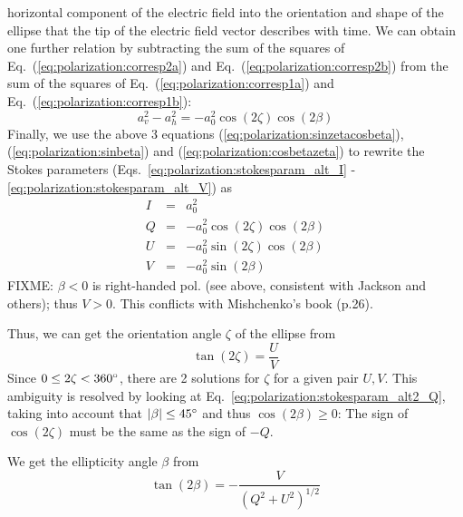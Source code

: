 horizontal component of the electric field into the orientation and
shape of the ellipse that the tip of the electric field vector describes with
time.  We can obtain one further relation by subtracting the sum of
the squares of Eq.~(\ref{eq:polarization:corresp2a}) and
Eq.~(\ref{eq:polarization:corresp2b}) from the sum of the squares of
Eq.~(\ref{eq:polarization:corresp1a}) and
Eq.~(\ref{eq:polarization:corresp1b}):
\begin{equation}
  \label{eq:polarization:cosbetazeta}
 a_v^2 - a_h^2 =  -a_0^2 \cos(2\zeta)\cos(2\beta)
\end{equation}
Finally, we use the above 3 equations
(\ref{eq:polarization:sinzetacosbeta}), 
(\ref{eq:polarization:sinbeta}) and 
(\ref{eq:polarization:cosbetazeta}) to rewrite the Stokes parameters
(Eqs.~\ref{eq:polarization:stokesparam_alt_I}%
-\ref{eq:polarization:stokesparam_alt_V}) 
as
\begin{eqnarray}
  \label{eq:polarization:stokesparam_alt2_I}
 I &=& a_0^2\\
  \label{eq:polarization:stokesparam_alt2_Q}
 Q &=&  -a_0^2 \cos(2\zeta)\cos(2\beta)\\ 
  \label{eq:polarization:stokesparam_alt2_U}
 U &=& -a_0^2 \sin(2\zeta)\cos(2\beta)\\
  \label{eq:polarization:stokesparam_alt2_V}
 V &=& -a_0^2 \sin(2\beta)
\end{eqnarray}
FIXME: $\beta<0$ is right-handed pol. (see above, consistent with
Jackson and others); thus $V>0$. This conflicts with Mishchenko's book
(p.26).
  

Thus, we can get the orientation angle $\zeta$ of the ellipse from
\begin{equation}
  \label{eq:polarization:tan2zeta}
 \tan(2\zeta) = \frac{U}{V}
\end{equation}
Since $0 \leq 2\zeta < 360^\circ$, there are 2 solutions for $\zeta$ for a
given pair $U,V$. This ambiguity is resolved by looking at
Eq.~\ref{eq:polarization:stokesparam_alt2_Q}, taking into account that
$|\beta| \leq 45^\circ$ and thus $\cos(2\beta) \geq 0$:
The sign of $\cos(2\zeta)$ must be the same as the sign of $-Q$.

We get the ellipticity angle $\beta$  from
\begin{equation}
  \label{eq:polarization:tan2beta}
 \tan(2\beta) = - \frac{V}{(Q^2 + U^2)^{1/2}}  
\end{equation}

